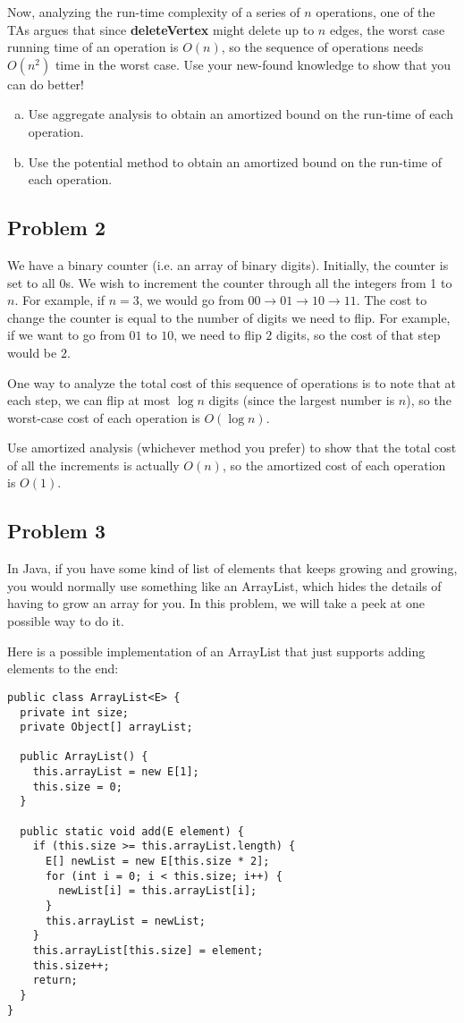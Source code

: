 Now, analyzing the run-time complexity of a series of $n$ operations, one of the TAs argues that since \textbf{deleteVertex} might delete up to $n$ edges, the worst case running time of an operation is $O(n)$, so the sequence of operations needs $O(n^2)$ time in the worst case. Use your new-found knowledge to show that you can do better!

\begin{enumerate}[(a)]
  \item Use aggregate analysis to obtain an amortized bound on the run-time of each operation.
  \item Use the potential method to obtain an amortized bound on the run-time of each operation.
\end{enumerate}

\subsection*{Problem 2}
We have a binary counter (i.e. an array of binary digits). Initially, the counter is set to all 0s. We wish to increment the counter through all the integers from 1 to $n$. For example, if $n=3$, we would go from $00 \rightarrow 01 \rightarrow 10 \rightarrow 11$. The cost to change the counter is equal to the number of digits we need to flip. For example, if we want to go from $01$ to $10$, we need to flip $2$ digits, so the cost of that step would be $2$.

One way to analyze the total cost of this sequence of operations is to note that at each step, we can flip at most $\log n$ digits (since the largest number is $n$), so the worst-case cost of each operation is $O(\log n)$.

Use amortized analysis (whichever method you prefer) to show that the total cost of all the increments is actually $O(n)$, so the amortized cost of each operation is $O(1)$.

\subsection*{Problem 3}
In Java, if you have some kind of list of elements that keeps growing and growing, you would normally use something like an ArrayList, which hides the details of having to grow an array for you. In this problem, we will take a peek at one possible way to do it.

Here is a possible implementation of an ArrayList that just supports adding elements to the end:
\begin{verbatim}
public class ArrayList<E> {
  private int size;
  private Object[] arrayList;

  public ArrayList() {
    this.arrayList = new E[1];
    this.size = 0;
  }

  public static void add(E element) {
    if (this.size >= this.arrayList.length) {
      E[] newList = new E[this.size * 2];
      for (int i = 0; i < this.size; i++) {
        newList[i] = this.arrayList[i];
      }
      this.arrayList = newList;
    }
    this.arrayList[this.size] = element;
    this.size++;
    return;
  }
}
\end{verbatim}

